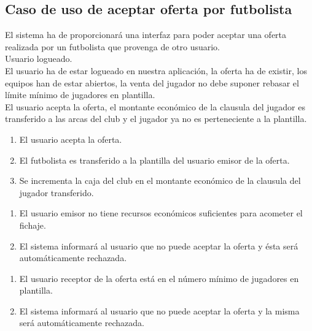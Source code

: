 \subsection*{Caso de uso de aceptar oferta por futbolista}
 El sistema ha de proporcionará una interfaz para poder
aceptar una oferta realizada por un futbolista que provenga de otro usuario.\\
 Usuario logueado. \\
 El usuario ha de estar logueado en nuestra aplicación,
la oferta ha de existir, los equipos han de estar abiertos, la venta del jugador
no debe suponer rebasar el límite mínimo de jugadores en plantilla. \\
 El usuario acepta la oferta, el montante económico de
la clausula del jugador es transferido a las arcas del club y el jugador ya no
es perteneciente a la plantilla.\\  
\begin{enumerate}
\item El usuario acepta la oferta.
\item El futbolista es transferido a la plantilla del usuario emisor de la
  oferta.
\item Se incrementa la caja del club en el montante económico de la clausula del
  jugador transferido.
\end{enumerate}
\begin{enumerate}
\item El usuario emisor no tiene recursos económicos suficientes para acometer
  el fichaje.
\item El sistema informará al usuario que no puede aceptar la oferta y ésta será
  automáticamente rechazada.
\end{enumerate}
\begin{enumerate}
\item El usuario receptor de la oferta está en el número mínimo de jugadores en
  plantilla.
\item El sistema informará al usuario que no puede aceptar la oferta y la misma
  será automáticamente rechazada.
\end{enumerate}
